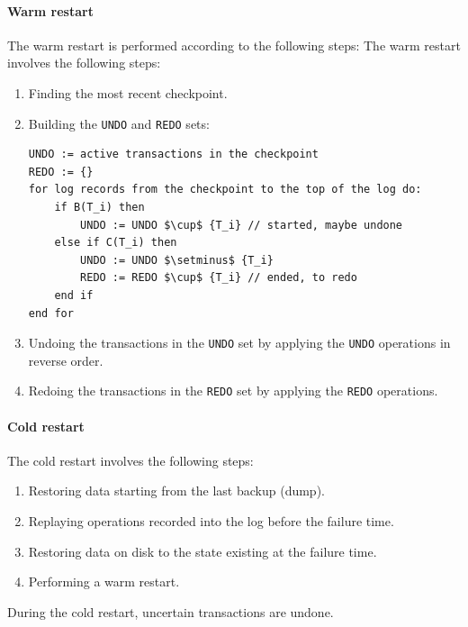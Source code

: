\paragraph*{Warm restart}
The warm restart is performed according to the following steps:
The warm restart involves the following steps:
\begin{enumerate}
    \item Finding the most recent checkpoint.
    \item Building the \texttt{UNDO} and \texttt{REDO} sets:
        \begin{lstlisting}[style=Java]
UNDO := active transactions in the checkpoint
REDO := {}
for log records from the checkpoint to the top of the log do:
    if B(T_i) then
        UNDO := UNDO $\cup$ {T_i} // started, maybe undone
    else if C(T_i) then
        UNDO := UNDO $\setminus$ {T_i}
        REDO := REDO $\cup$ {T_i} // ended, to redo
    end if
end for
        \end{lstlisting}
    \item Undoing the transactions in the \texttt{UNDO} set by applying the \texttt{UNDO} operations in reverse order.
    \item Redoing the transactions in the \texttt{REDO} set by applying the \texttt{REDO} operations.
\end{enumerate}

\paragraph*{Cold restart}
The cold restart involves the following steps:
\begin{enumerate}
\item Restoring data starting from the last backup (dump).
\item Replaying operations recorded into the log before the failure time.
\item Restoring data on disk to the state existing at the failure time.
\item Performing a warm restart.
\end{enumerate}
During the cold restart, uncertain transactions are undone.